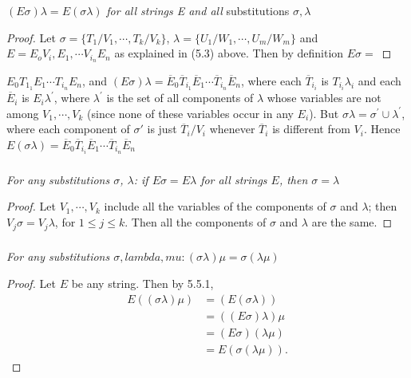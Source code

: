 \documentclass[8pt]{extarticle}
\begin{document}
\subsubsection{}
$(E\sigma)\lambda = E(\sigma\lambda)$ \emph{for all strings E and all} substitutions $\sigma, \lambda$

\begin{proof}
Let $\sigma = \{T_1/V_1,\dotsm,T_k/V_k\}$, $\lambda = \{U_1/W_1,\dotsm,U_m/W_m\}$ and\\$E = E_oV_i,E_1,\dotsm V_{i_n}E_n$ as explained in (5.3) above. Then by definition $E\sigma =$
\end{proof}

$E_0T_{1_1}E_1\dotsm T_{i_n}E_n$, and $(E\sigma)\lambda = \overline{E}_0\overline{T}_{i_1}\overline{E}_1\dotsm\overline{T}_{i_n}\overline{E}_n$, where each $\overline{T}_{i_i}$ is $T_{i_i}\lambda_i$ and each $\overline{E}_i$ is $E_i\lambda^\prime$, where $\lambda^\prime$ is the set of all components of $\lambda$ whose variables are not among $V_1,\dotsm,V_k$ (since none of these variables occur in any $E_i$). But $\sigma\lambda = \sigma^\prime \cup \lambda^\prime$, where each component of $\sigma\prime$ is just $\overline{T}_i/V_i$ whenever $\overline{T}_i$ is different from $V_i$. Hence $E(\sigma\lambda) = \overline{E}_0\overline{T}_{i_i}\overline{E}_1\dotsm\overline{T}_{i_n}\overline{E}_n$

\subsubsection{}
\emph{For any substitutions $\sigma$, $\lambda$: if $E\sigma = E\lambda$ for all strings $E$, then $\sigma = \lambda$}
\begin{proof}
Let $V_1,\dotsm,V_k$ include all the variables of the components of $\sigma$ and $\lambda$; then $V_j\sigma = V_j\lambda$, for $1 \leq j \leq k$. Then all the components of $\sigma$ and $\lambda$ are the same.
\end{proof}

\subsubsection{}
\emph{For any substitutions $\sigma, lambda, mu: (\sigma\lambda)\mu = \sigma(\lambda\mu)$}
\begin{proof}
Let $E$ be any string. Then by 5.5.1,
\begin{align*}
    E((\sigma\lambda)\mu) &= (E(\sigma\lambda))\\
                          &= ((E\sigma)\lambda)\mu\\
                          &= (E\sigma)(\lambda\mu)\\
                          &= E(\sigma(\lambda\mu)).
\end{align*}
\end{proof}
\end{document}
